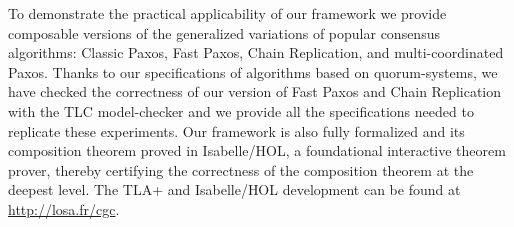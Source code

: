 \begin{comment}
Allowing the execution of commuting commands to proceed without
synchronization is an important practical optimization, as commands may
often commute in practice, for example when operating on disjoint parts
of a data structure. To enable the synchronization-free execution of
commuting commands, we have based our framework on Generalized Consensus~\cite{Lamport05GeneralizeConsensus}. Traditional SMR implementations use a
separate instance of a consensus algorithm to agree on the command to execute
at each index of the command sequence on which the replicas must agree. Using
separate consensus instances makes it hard to optimize the execution of
commuting command because commutativity is not a property of a single command.
Instead of restricting agreement to a single value, the Generalized Consensus
problem requires that set of replica servers agree on the state of a growing
data structure called a command-structure set. A command-structure set is
a data structure with an append operation such that the order in which two
commuting commands are appended does not change the resulting state. Thanks to
this property, two replicas executing commuting commands in a different order
will not end up in a different state and can continue executing without further
synchronization. In message-passing systems, this property can be leveraged to
reduce the latency of processing one command to two message delays instead of
three. 

In practice, a SMR algorithm must support fast reconfiguration to replace
faulty components, without which the long-term stability of a system is
inevitably compromised. Our framework abstracts over how the reconfiguration
decisions are made, providing an interface allowing to plug in an external
reconfiguration master implementing the reconfiguration policy of the
system. The master decides which GC module to run next and which replica
servers will participate, removing failed replicas and adding new ones. The
reconfiguration master enables tolerating $k$ failures with $k+1$ replicas~\cite{LamportMalkhiZhou09VerticalPaxosPrimarybackupReplication}, an important
improvement over the traditional $2k+1$ needed replicas.
\end{comment}

To demonstrate the practical applicability of our framework we provide
composable versions of the generalized variations of popular consensus
algorithms: Classic Paxos, Fast Paxos, Chain Replication, and multi-coordinated
Paxos. Thanks to our specifications of algorithms based on quorum-systems, 
we have checked the correctness of our version of Fast Paxos and Chain Replication with the TLC
model-checker and we provide all the specifications needed to replicate these
experiments. Our framework is also fully formalized and its composition theorem
proved in Isabelle/HOL, a foundational interactive theorem prover, thereby
certifying the correctness of the composition theorem at the deepest level.
The TLA+ and Isabelle/HOL development can be found at \url{http://losa.fr/cgc}.

